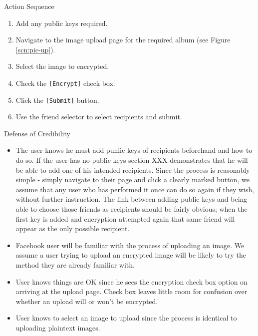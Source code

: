 \begin{desc}

    \item[Action Sequence] \hfill
    \begin{enumerate}
        \item Add any public keys required.
        \item Navigate to the image upload page for the required album (see Figure \ref{scn:pic-up}).
        \item Select the image to encrypted.
        \item Check the {\tt [Encrypt]} check box.
        \item Click the {\tt [Submit]} button.
        \item Use the friend selector to select recipients and submit.
    \end{enumerate}
    
    \item[Defense of Credibility] \hfill
        \begin{itemize}
            
            \item The user knows he must add punlic keys of recipients beforehand and how to do so. If the user has no public keys section XXX demonstrates that he will be able to add one of his intended recipients. Since the process is reasonably simple - simply navigate to their page and click a clearly marked button, we assume that any user who has performed it once can do so again if they wish, without further instruction. The link between adding public keys and being able to choose those friends as recipients should be fairly obvious; when the first key is added and encryption attempted again that same friend will appear as the only possible recipient.
            
            \item Facebook user will be familiar with the process of uploading an image. We assume a user trying to upload an encrypted image will be likely to try the method they are already familiar with.
            
            \item User knows things are OK since he sees the encryption check box option on arriving at the upload page. Check box leaves little room for confusion over whether an upload will or won't be encrypted.
            
            \item User knows to select an image to upload since the process is identical to uploading plaintext images.
            

\end{itemize}
\end{desc}
